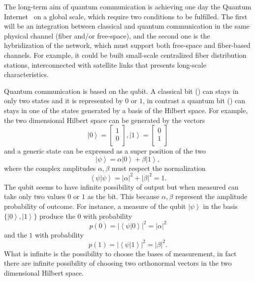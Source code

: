 The long-term aim of quantum communication is achieving one day the Quantum Internet~\cite{a19} on a global scale, which require two conditions to be fulfilled. The first will be an integration between classical and quantum communication in the same physical channel (fiber and/or free-space), and the second one is the hybridization of the network, which must support both free-space and fiber-based channels. For example, it could be built small-scale centralized fiber distribution stations, interconnected with satellite links that presents long-scale characteristics.


Quantum communication is based on the qubit. A classical bit () can stays in only two states and it is represented by $0$ or $1$, in contrast a quantum bit () can stays in one of the states generated by a basis of the Hilbert space.
For example, the two dimensional Hilbert space can be generated by the vectors
\begin{equation}
  \left|0\right> = \begin{bmatrix} 1 \\ 0 \\ \end{bmatrix}, \left|1\right> = \begin{bmatrix} 0 \\ 1 \\ \end{bmatrix}
\end{equation}
and a generic state can be expressed as a super position of the two
\begin{equation}
  \left|\psi\right> = \alpha\left|0\right> + \beta\left|1\right>,
\end{equation}
where the complex amplitudes $\alpha, \beta$ must respect the normalization
\begin{equation}
  \left<\psi|\psi\right> = |\alpha|^2 + |\beta|^2 = 1.
\end{equation}
The qubit seems to have infinite possibility of output but when measured can take only two values $0$ or $1$ as the bit. This because $\alpha, \beta$ represent the amplitude probability of outcome. For instance, a measure of the qubit $\left|\psi\right>$ in the basis $\{\left|0\right>, \left|1\right>\}$ produce the $0$ with probability
\begin{equation}
  p(0) = |\left<\psi|0\right>|^2 = |\alpha|^2
\end{equation}
and the $1$ with probability
\begin{equation}
  p(1) = |\left<\psi|1\right>|^2 = |\beta|^2.
\end{equation}
What is infinite is the possibility to choose the bases of measurement, in fact there are infinite possibility of choosing two orthonormal vectors in the two dimensional Hilbert space.


